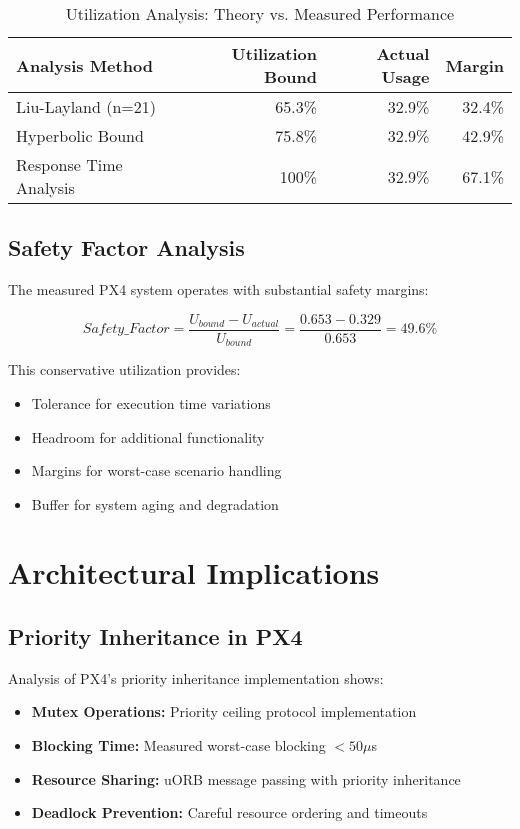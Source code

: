 \documentclass[12pt,a4paper]{article}
\begin{document}
\begin{table}[H]
\centering
\begin{tabular}{|l|r|r|r|}
\hline
\textbf{Analysis Method} & \textbf{Utilization Bound} & \textbf{Actual Usage} & \textbf{Margin} \\
\hline
Liu-Layland (n=21) & 65.3\% & 32.9\% & 32.4\% \\
Hyperbolic Bound & 75.8\% & 32.9\% & 42.9\% \\
Response Time Analysis & 100\% & 32.9\% & 67.1\% \\
\hline
\end{tabular}
\caption{Utilization Analysis: Theory vs. Measured Performance}
\end{table}

\subsection{Safety Factor Analysis}

The measured PX4 system operates with substantial safety margins:

$$Safety\_Factor = \frac{U_{bound} - U_{actual}}{U_{bound}} = \frac{0.653 - 0.329}{0.653} = 49.6\%$$

This conservative utilization provides:
\begin{itemize}
\item Tolerance for execution time variations
\item Headroom for additional functionality
\item Margins for worst-case scenario handling
\item Buffer for system aging and degradation
\end{itemize}

\section{Architectural Implications}

\subsection{Priority Inheritance in PX4}

Analysis of PX4's priority inheritance implementation shows:

\begin{itemize}
\item \textbf{Mutex Operations:} Priority ceiling protocol implementation
\item \textbf{Blocking Time:} Measured worst-case blocking $< 50\mu$s
\item \textbf{Resource Sharing:} uORB message passing with priority inheritance
\item \textbf{Deadlock Prevention:} Careful resource ordering and timeouts
\end{itemize}
\end{document}
